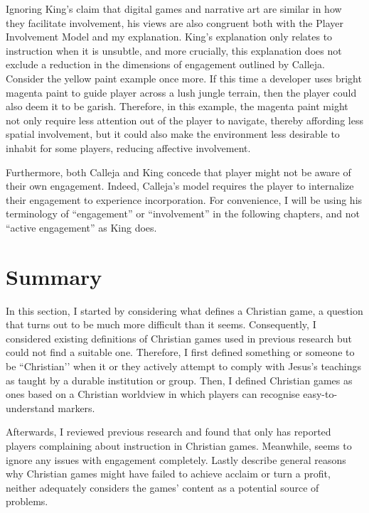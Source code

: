 Ignoring King's claim that digital games and narrative art are similar in how they facilitate involvement, his views are also congruent both with the Player Involvement Model and my explanation. King's explanation only relates to instruction when it is unsubtle, and more crucially, this explanation does not exclude a reduction in the dimensions of engagement outlined by Calleja. Consider the yellow paint example once more. If this time a developer uses bright magenta paint to guide player across a lush jungle terrain, then the player could also deem it to be garish. Therefore, in this example, the magenta paint might not only require less attention out of the player to navigate, thereby affording less spatial involvement, but it could also make the environment less desirable to inhabit for some players, reducing affective involvement.

Furthermore, both Calleja and King concede that player might not be aware of their own engagement. Indeed, Calleja's model requires the player to internalize their engagement to experience incorporation.
For convenience, I will be using his terminology of ``engagement'' or ``involvement'' in the following chapters, and not ``active engagement'' as King does.

\section{Summary}

In this section, I started by considering what defines a Christian game, a question that turns out to be much more difficult than it seems. Consequently, I considered existing definitions of Christian games used in previous research but could not find a suitable one. Therefore, I first defined something or someone to be ``Christian’’ when it or they actively attempt to comply with Jesus’s teachings as taught by a durable institution or group. Then, I defined Christian games as ones based on a Christian worldview in which players can recognise easy-to-understand markers. 

Afterwards, I reviewed previous research and found that only \textcite{schut_making_2013} has reported players complaining about instruction in Christian games. Meanwhile, \textcite{gonzalez_born-again_2014} seems to ignore any issues with engagement completely. Lastly \textcite{bernauer_playing_2012, schut_swords_2026} describe general reasons why Christian games might have failed to achieve acclaim or turn a profit, neither adequately considers the games’ content as a potential source of problems.

